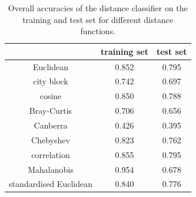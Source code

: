 \documentclass[11pt]{article}
\begin{document}
\begin{table}[!t]
\centering
\small
\begin{tabular}{c|cc}
&training set&test set\\\hline
Euclidean&0.852&0.795\\
city block&0.742&0.697\\
cosine&0.850&0.788\\
Bray-Curtis&0.706&0.656\\
Canberra&0.426&0.395\\
Chebyshev&0.823&0.762\\
correlation&0.855&0.795\\
Mahalanobis&0.954&0.678\\
standardised Euclidean&0.840&0.776
\end{tabular}
\caption{Overall accuracies of the distance classifier on the training and test set for different distance functions.}
\normalsize
\end{table}
\newpage
\end{document}

